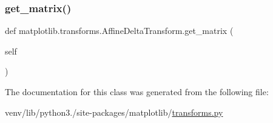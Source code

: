 \subsubsection{\texorpdfstring{get\+\_\+matrix()}{get\_matrix()}}
{\footnotesize\ttfamily def matplotlib.\+transforms.\+Affine\+Delta\+Transform.\+get\+\_\+matrix (\begin{DoxyParamCaption}\item[{}]{self }\end{DoxyParamCaption})}



The documentation for this class was generated from the following file\+:\begin{DoxyCompactItemize}
\item 
venv/lib/python3./site-\/packages/matplotlib/\hyperlink{transforms_8py}{transforms.\+py}\end{DoxyCompactItemize}
